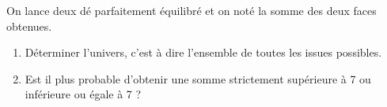 
On lance deux dé parfaitement équilibré et on noté la somme des deux faces obtenues.
\begin{enumerate}
\item Déterminer l'univers, c'est à dire l'ensemble de toutes les issues possibles.
\item Est il plus probable d'obtenir une somme strictement supérieure à 7 ou inférieure ou égale à 7  ?
\end{enumerate}